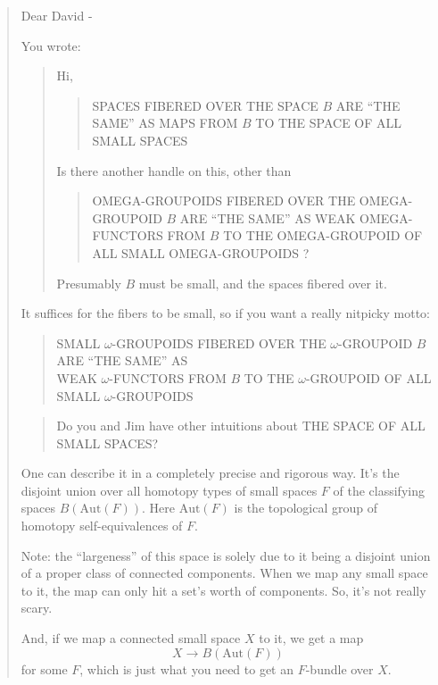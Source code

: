 \documentclass{article}
\begin{document}
\begin{quote}
Dear David -

You wrote:

\begin{quote}
Hi,

\begin{quote}
SPACES FIBERED OVER THE SPACE \(B\) ARE ``THE SAME'' AS MAPS FROM \(B\)
TO THE SPACE OF ALL SMALL SPACES
\end{quote}

Is there another handle on this, other than

\begin{quote}
OMEGA-GROUPOIDS FIBERED OVER THE OMEGA-GROUPOID \(B\) ARE ``THE SAME''
AS WEAK OMEGA-FUNCTORS FROM \(B\) TO THE OMEGA-GROUPOID OF ALL SMALL
OMEGA-GROUPOIDS ?
\end{quote}

Presumably \(B\) must be small, and the spaces fibered over it.
\end{quote}

It suffices for the fibers to be small, so if you want a really nitpicky
motto:

\begin{quote}
SMALL \(\omega\)-GROUPOIDS FIBERED OVER THE \(\omega\)-GROUPOID \(B\)\\
ARE ``THE SAME'' AS\\
WEAK \(\omega\)-FUNCTORS FROM \(B\) TO THE \(\omega\)-GROUPOID OF ALL\\
SMALL \(\omega\)-GROUPOIDS\\
\end{quote}

\begin{quote}
Do you and Jim have other intuitions about THE SPACE OF ALL SMALL
SPACES?
\end{quote}

One can describe it in a completely precise and rigorous way. It's the
disjoint union over all homotopy types of small spaces \(F\) of the
classifying spaces \(B(\mathrm{Aut}(F))\). Here \(\mathrm{Aut}(F)\) is
the topological group of homotopy self-equivalences of \(F\).

Note: the ``largeness'' of this space is solely due to it being a
disjoint union of a proper class of connected components. When we map
any small space to it, the map can only hit a set's worth of components.
So, it's not really scary.

And, if we map a connected small space \(X\) to it, we get a map
\[X \to B(\mathrm{Aut}(F))\] for some \(F\), which is just what you need
to get an \(F\)-bundle over \(X\).


\end{quote}
\end{document}
